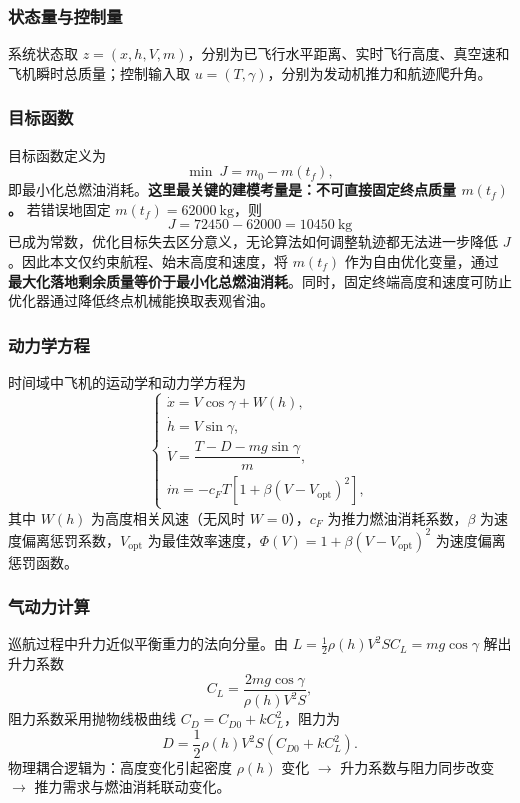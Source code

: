 \documentclass[withoutpreface,bwprint]{cumcmthesis}
\begin{document}
\subsubsection{状态量与控制量}

系统状态取 $z=(x,h,V,m)$，分别为已飞行水平距离、实时飞行高度、真空速和飞机瞬时总质量；控制输入取 $u=(T,\gamma)$，分别为发动机推力和航迹爬升角。

\subsubsection{目标函数}

目标函数定义为
\begin{equation}
\min\ J = m_0 - m(t_f),
\label{eq:q3_objective}
\end{equation}
即最小化总燃油消耗。\textbf{这里最关键的建模考量是：不可直接固定终点质量 $m(t_f)$。} 若错误地固定 $m(t_f)=62000\ \mathrm{kg}$，则
\[
J=72450-62000=10450\ \mathrm{kg}
\]
已成为常数，优化目标失去区分意义，无论算法如何调整轨迹都无法进一步降低 $J$。因此本文仅约束航程、始末高度和速度，将 $m(t_f)$ 作为自由优化变量，通过\textbf{最大化落地剩余质量等价于最小化总燃油消耗}。同时，固定终端高度和速度可防止优化器通过降低终点机械能换取表观省油。

\subsubsection{动力学方程}

时间域中飞机的运动学和动力学方程为
\begin{equation}
\begin{cases}
\dot x = V\cos\gamma + W(h),\\[3pt]
\dot h = V\sin\gamma,\\[3pt]
\dot V = \dfrac{T-D-mg\sin\gamma}{m},\\[8pt]
\dot m = -c_F T\left[1+\beta\left(V-V_{\mathrm{opt}}\right)^2\right],
\end{cases}
\label{eq:q3_dynamics}
\end{equation}
其中 $W(h)$ 为高度相关风速（无风时 $W=0$），$c_F$ 为推力燃油消耗系数，$\beta$ 为速度偏离惩罚系数，$V_{\mathrm{opt}}$ 为最佳效率速度，$\Phi(V)=1+\beta(V-V_{\mathrm{opt}})^2$ 为速度偏离惩罚函数。

\subsubsection{气动力计算}

巡航过程中升力近似平衡重力的法向分量。由 $L=\frac12\rho(h)V^2SC_L=mg\cos\gamma$ 解出升力系数
\begin{equation}
C_L = \frac{2mg\cos\gamma}{\rho(h)V^2 S},
\label{eq:q3_CL}
\end{equation}
阻力系数采用抛物线极曲线 $C_D=C_{D0}+kC_L^2$，阻力为
\begin{equation}
D = \frac12\rho(h)V^2 S \left(C_{D0} + k C_L^2\right).
\label{eq:q3_drag}
\end{equation}
物理耦合逻辑为：高度变化引起密度 $\rho(h)$ 变化 $\rightarrow$ 升力系数与阻力同步改变 $\rightarrow$ 推力需求与燃油消耗联动变化。
\end{document}
